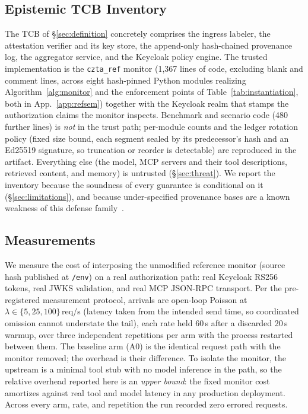 \documentclass[conference]{IEEEtran}
\begin{document}
\subsection{Epistemic TCB Inventory}
\label{sec:tcb}
The TCB of \S\ref{sec:definition} concretely comprises the ingress
labeler, the attestation verifier and its key store, the
append-only hash-chained provenance log, the aggregator service,
and the Keycloak policy engine. The trusted implementation is the
\texttt{czta\_ref} monitor (1{,}367 lines of code, excluding blank
and comment lines, across eight hash-pinned Python modules
realizing Algorithm~\ref{alg:monitor} and the enforcement points of
Table~\ref{tab:instantiation}, both in App.~\ref{app:refsem}) together with
the Keycloak realm
that stamps the authorization claims the monitor inspects.
Benchmark and scenario code (480 further lines) is \emph{not} in
the trust path; per-module counts and the ledger rotation policy
(fixed size bound, each segment sealed by its predecessor's hash
and an Ed25519 signature, so truncation or reorder is detectable)
are reproduced in the artifact. Everything else (the model, MCP
servers and their tool descriptions, retrieved content, and
memory) is untrusted (\S\ref{sec:threat}). We report the inventory
because the soundness of every guarantee is conditional on it
(\S\ref{sec:limitations}), and because under-specified provenance
bases are a known weakness of this defense family~\cite{oob}.

\subsection{Measurements}
We measure the cost of interposing the unmodified reference
monitor (source hash published at \texttt{/env}) on a real
authorization path: real Keycloak RS256 tokens, real JWKS
validation, and real MCP JSON-RPC transport. Per the
pre-registered measurement protocol, arrivals are open-loop
Poisson at $\lambda \in \{5, 25, 100\}$\,req/s (latency taken from
the intended send time, so coordinated omission cannot understate
the tail), each rate held 60\,s after a discarded 20\,s warmup,
over three independent repetitions per arm with the process
restarted between them. The baseline arm (A0) is the identical
request path with the monitor removed; the overhead is their
difference. To isolate the monitor, the upstream is a minimal tool
stub with no model inference in the path, so the relative
overhead reported here is an \emph{upper bound}: the fixed monitor
cost amortizes against real tool and model latency in any
production deployment. Across every arm, rate, and repetition the
run recorded zero errored requests.
\end{document}
